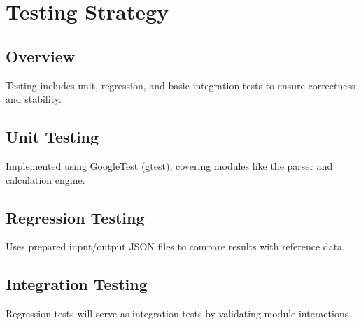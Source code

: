 \documentclass{article}
\begin{document}
\section{Testing Strategy}
\subsection{Overview}
Testing includes unit, regression, and basic integration tests to ensure correctness and stability.

\subsection{Unit Testing}
Implemented using GoogleTest (gtest), covering modules like the parser and calculation engine.

\subsection{Regression Testing}
Uses prepared input/output JSON files to compare results with reference data.

\subsection{Integration Testing}
Regression tests will serve as integration tests by validating module interactions.
\end{document}
